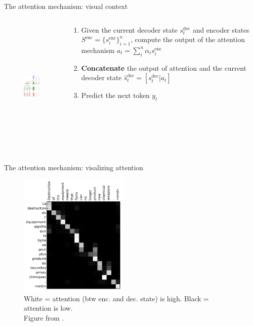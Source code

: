 \documentclass[12pt,aspectratio=169,handout]{beamer}
\begin{document}
\begin{frame}{The attention mechanism: visual context}

	\begin{columns}[T]
		\begin{column}{0.49\textwidth}
			\begin{figure}[h]
				\includegraphics[height=6.5cm]{seq2seq_attention_t1.pdf}
			\end{figure}	
		\end{column}
		\begin{column}{0.49\textwidth}
			\begin{enumerate}
			\pause
			\item Given the current decoder state $s^{\text{dec}}_t$ and encoder states $S^{\text{enc}} = \{s_i^{\text{enc}}\}_{i=1}^n$, 
				compute the output of the attention mechanism $a_t = \sum_i^n \alpha_i s_i^{\text{enc}}$
			\pause
			\item \textbf{Concatenate} the output of attention and the current decoder state $\hat{s}_t^{\text{dec}} = [s^{\text{dec}}_t | a_t]$
			\pause
			\item Predict the next token $y_t$
			\end{enumerate}
			\end{column}
	\end{columns}
	
\end{frame}

\begin{frame}{The attention mechanism: visalizing attention}
	\begin{figure}[h]
		\includegraphics[height=6cm]{translation_heatmap}
		\caption*{White = attention (btw enc. and dec. state) is high. Black = attention is low.\\ Figure from \cite{bahdanau2014neural}.}
	\end{figure}	
\end{frame}
\end{document}
